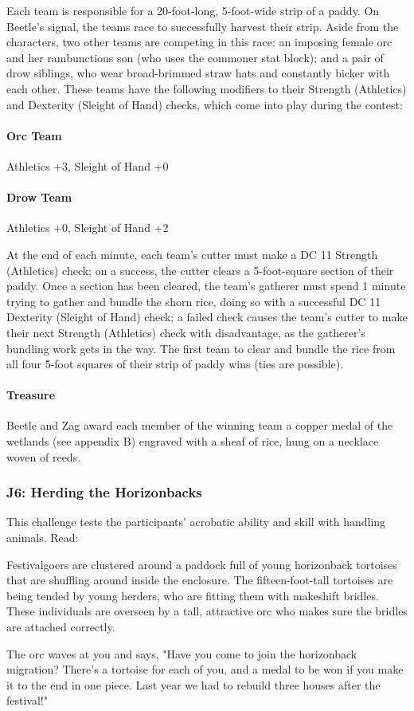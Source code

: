 \documentclass[10pt,a4paper,twoside,bg=print,twocolumn,openany,nodeprecatedcode]{dndbook}
\begin{document}
Each team is responsible for a 20-foot-long, 5-foot-wide strip of a paddy. On Beetle's signal, the teams race to successfully harvest their strip. Aside from the characters, two other teams are competing in this race: an imposing female orc and her rambunctious son (who uses the commoner stat block); and a pair of drow siblings, who wear broad-brimmed straw hats and constantly bicker with each other. These teams have the following modifiers to their Strength (Athletics) and Dexterity (Sleight of Hand) checks, which come into play during the contest:

\paragraph{Orc Team}
Athletics +3, Sleight of Hand +0

\paragraph{Drow Team}
Athletics +0, Sleight of Hand +2

At the end of each minute, each team's cutter must make a DC 11 Strength (Athletics) check; on a success, the cutter clears a 5-foot-square section of their paddy. Once a section has been cleared, the team's gatherer must spend 1 minute trying to gather and bundle the shorn rice, doing so with a successful DC 11 Dexterity (Sleight of Hand) check; a failed check causes the team's cutter to make their next Strength (Athletics) check with disadvantage, as the gatherer's bundling work gets in the way. The first team to clear and bundle the rice from all four 5-foot squares of their strip of paddy wins (ties are possible).

\paragraph{Treasure}
Beetle and Zag award each member of the winning team a copper medal of the wetlands (see appendix B) engraved with a sheaf of rice, hung on a necklace woven of reeds.

\subsubsection{J6: Herding the Horizonbacks}
This challenge tests the participants' acrobatic ability and skill with handling animals. Read:

\begin{DndReadAloud}{}
Festivalgoers are clustered around a paddock full of young horizonback tortoises that are shuffling around inside the enclosure. The fifteen-foot-tall tortoises are being tended by young herders, who are fitting them with makeshift bridles. These individuals are overseen by a tall, attractive orc who makes sure the bridles are attached correctly.

The orc waves at you and says, "Have you come to join the horizonback migration? There's a tortoise for each of you, and a medal to be won if you make it to the end in one piece. Last year we had to rebuild three houses after the festival!"

\end{DndReadAloud}
\end{document}
